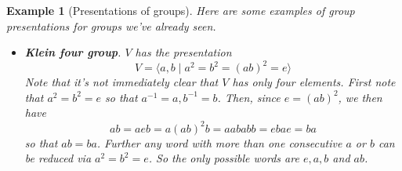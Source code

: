\documentclass[12pt]{article}
\numberwithin{equation}{subsection}
\theoremstyle{note}
\newtheorem{example}[subsection]{Example}
\begin{document}
\begin{example}[Presentations of groups] Here are some examples of group presentations for groups we've already seen.

\begin{itemize}
	\item \textbf{Klein four group}. $V$ has the presentation \begin{equation} V=\langle a,b \mid a^2=b^2=(ab)^2=e\rangle \end{equation}
	Note that it's not immediately clear that $V$ has only four elements. First note that $a^2=b^2=e$ so that $a^{-1}=a, b^{-1}=b$. Then, since $e=(ab)^2$, we then have \[ab=aeb=a(ab)^2b=aababb=ebae=ba\] so that $ab=ba$. Further any word with more than one consecutive $a$ or $b$ can be reduced via $a^2=b^2=e$. So the only possible words are $e,a,b$ and $ab$. 
	

\end{itemize}
\end{example}
\end{document}
